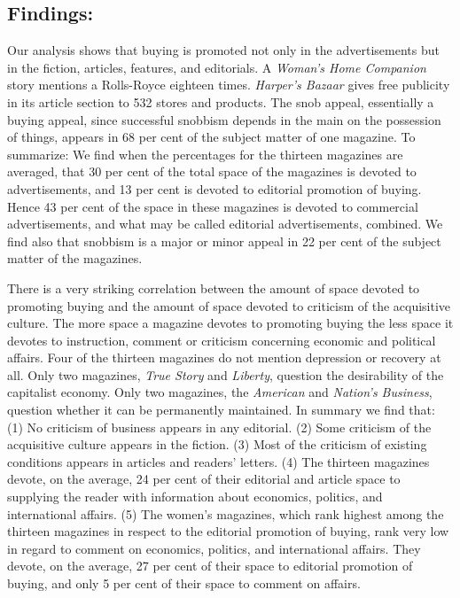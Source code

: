 \documentclass[openany,nobib]{tufte-book}
\begin{document}
\subsection{Findings:}


Our analysis shows that buying is promoted not only in the
advertisements but in the fiction, articles, features, and editorials. A
\emph{Woman's Home Companion} story mentions a Rolls-Royce eighteen
times. \emph{Harper's Bazaar} gives free publicity in its article
section to 532 stores and products. The snob appeal, essentially a
buying appeal, since successful snobbism depends in the main on the
possession of things, appears in 68 per cent of the subject matter of
one magazine. To summarize: We find when the percentages for the
thirteen magazines are averaged, that 30 per cent of the total space of
the magazines is devoted to advertisements, and 13 per cent is devoted
to editorial promotion of buying. Hence 43 per cent of the space in
these magazines is devoted to commercial advertisements, and what may be
called editorial advertisements, combined. We find also that snobbism is
a major or minor appeal in 22 per cent of the subject matter of the
magazines.

There is a very striking correlation between the amount of space devoted
to promoting buying and the amount of space devoted to criticism of the
acquisitive culture. The more space a magazine devotes to promoting
buying the less space it devotes to instruction, comment or criticism
concerning economic and political affairs. Four of the thirteen
magazines do not mention depression or recovery at all. Only two
magazines, \emph{True Story} and \emph{Liberty}, question the
desirability of the capitalist economy. Only two magazines, the
\emph{American} and \emph{Nation's Business}, question whether it can be
permanently maintained. In summary we find that: (1) No criticism of
business appears in any editorial. (2) Some criticism of the acquisitive
culture appears in the fiction. (3) Most of the criticism of existing
conditions appears in articles and readers' letters. (4) The thirteen
magazines devote, on the average, 24 per cent of their editorial and
article space to supplying the reader with information about economics,
politics, and international affairs. (5) The women's magazines, which
rank highest among the thirteen magazines in respect to the editorial
promotion of buying, rank very low in regard to comment on economics,
politics, and international affairs. They devote, on the average, 27 per
cent of their space to editorial promotion of buying, and only 5 per
cent of their space to comment on affairs.
\end{document}
